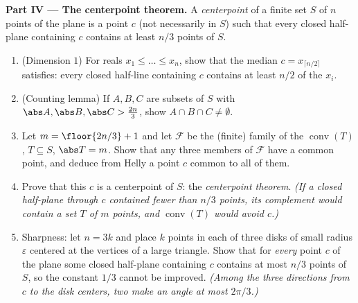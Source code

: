 \begin{problem}
\medskip
\noindent\textbf{Part IV --- The centerpoint theorem.} A
\emph{centerpoint} of a finite set $S$ of $n$ points of the
plane is a point $c$ (not necessarily in $S$) such that every
closed half-plane containing $c$ contains at least $n/3$
points of $S$.
\begin{enumerate}[resume]
  \item (Dimension $1$) For reals $x_1 \leq \dots \leq x_n$,
        show that the median $c = x_{\lceil n/2 \rceil}$
        satisfies: every closed half-line containing $c$
        contains at least $n/2$ of the $x_i$.
  \item (Counting lemma) If $A, B, C$ are subsets of $S$ with
        $\abs A, \abs B, \abs C > \tfrac{2n}3$, show $A \cap
        B \cap C \neq \emptyset$.
  \item Let $m = \floor{2n/3} + 1$ and let $\mathcal F$ be
        the (finite) family of the 
        $\operatorname{conv}(T)$, $T \subseteq S$, $\abs T =
        m$. Show that any three members of $\mathcal F$ have
        a common point, and deduce from Helly a point $c$
        common to all of them.
  \item Prove that this $c$ is a centerpoint of $S$: the
        \emph{centerpoint theorem}. \emph{(If a closed
        half-plane through $c$ contained fewer than $n/3$
        points, its  complement would contain a set $T$
        of $m$ points, and $\operatorname{conv}(T)$ would
        avoid $c$.)}
  \item Sharpness: let $n = 3k$ and place $k$ points in each
        of three disks of small radius $\varepsilon$ centered
        at the vertices of a large triangle. Show that for
        \emph{every} point $c$ of the plane some closed
        half-plane containing $c$ contains at most $n/3$
        points of $S$, so the constant $1/3$ cannot be
        improved. \emph{(Among the three directions from $c$
        to the disk centers, two make an angle at most
        $2\pi/3$.)}
\end{enumerate}


\end{problem}
